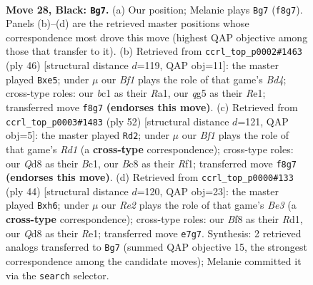 \documentclass[11pt]{article}
\begin{document}
\clearpage

\begin{figure}[p]\centering
\begin{subfigure}{0.46\textwidth}\centering
\resizebox{\linewidth}{!}{%
\newchessgame
\chessboard[
  setfen={2bq1bk1/rp1pr2p/p3p3/2P2pQ1/P1nP2BP/2N2N2/1P3PK1/R1B2R2 b - - 1 28},
  showmover=false,
  pgfstyle=straightmove, color=movearrow, markmove={f8-g7}
]}
\caption{}
\end{subfigure}\hfill
\begin{subfigure}{0.46\textwidth}\centering
\resizebox{\linewidth}{!}{%
\newchessgame
\chessboard[
  setfen={1r2r1k1/1pp2ppp/p2b1n2/N2Pnq1b/1P1B4/P1N3P1/3Q1PBP/R3R1K1 w - - 17 24},
  showmover=false,
  pgfstyle=straightmove, color=movearrow, markmove={d4-e5}
]}
\caption{}
\end{subfigure}
\\[4pt]
\begin{subfigure}{0.46\textwidth}\centering
\resizebox{\linewidth}{!}{%
\newchessgame
\chessboard[
  setfen={2rr2k1/3n1pp1/1bp2np1/ppq5/4P3/1P3PPP/P1Q1N1BK/2BR1R2 w - - 4 27},
  showmover=false,
  pgfstyle=straightmove, color=movearrow, markmove={d1-d2}
]}
\caption{}
\end{subfigure}\hfill
\begin{subfigure}{0.46\textwidth}\centering
\resizebox{\linewidth}{!}{%
\newchessgame
\chessboard[
  setfen={r3rbk1/5pp1/2p1bpnp/p3q3/2P5/3BB1NP/P1Q2PP1/3RR1K1 w - - 2 23},
  showmover=false,
  pgfstyle=straightmove, color=movearrow, markmove={e3-h6}
]}
\caption{}
\end{subfigure}
\caption{\textbf{Move 28, Black: \texttt{Bg7}.} (a) Our position; Melanie plays \texttt{Bg7} (\texttt{f8g7}). Panels (b)--(d) are the retrieved master positions whose correspondence most drove this move (highest QAP objective among those that transfer to it). (b) Retrieved from \texttt{ccrl\_top\_p0002\#1463} (ply 46) [structural distance $d$=119, QAP obj=11]: the master played \texttt{Bxe5}; under $\mu$ our \emph{Bf1} plays the role of that game's \emph{Bd4}; cross-type roles: our \emph{b}c1 as their \emph{R}a1, our \emph{q}g5 as their \emph{R}e1; transferred move \texttt{f8g7} \textbf{(endorses this move)}. (c) Retrieved from \texttt{ccrl\_top\_p0003\#1483} (ply 52) [structural distance $d$=121, QAP obj=5]: the master played \texttt{Rd2}; under $\mu$ our \emph{Bf1} plays the role of that game's \emph{Rd1} (a \textbf{cross-type} correspondence); cross-type roles: our \emph{Q}d8 as their \emph{B}c1, our \emph{B}c8 as their \emph{R}f1; transferred move \texttt{f8g7} \textbf{(endorses this move)}. (d) Retrieved from \texttt{ccrl\_top\_p0000\#133} (ply 44) [structural distance $d$=120, QAP obj=23]: the master played \texttt{Bxh6}; under $\mu$ our \emph{Re2} plays the role of that game's \emph{Be3} (a \textbf{cross-type} correspondence); cross-type roles: our \emph{B}f8 as their \emph{R}d1, our \emph{Q}d8 as their \emph{R}e1; transferred move \texttt{e7g7}. Synthesis: 2 retrieved analogs transferred to \texttt{Bg7} (summed QAP objective 15, the strongest correspondence among the candidate moves); Melanie committed it via the \texttt{search} selector.}
\label{fig:thought-m55}
\end{figure}
\end{document}
